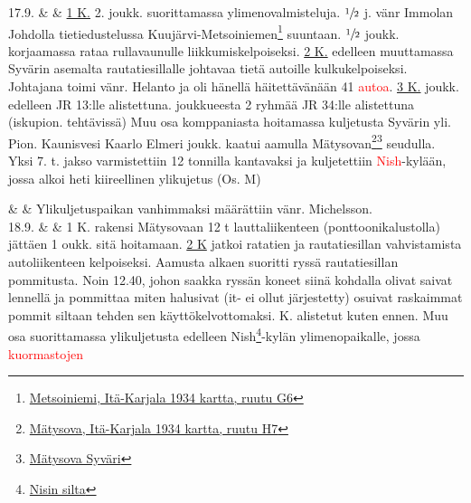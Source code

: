 \documentclass[11pt,a5paper,oneside]{book}
\begin{document}
\newpage

17.9. & & \underline{1 K.} 2. joukk. suorittamassa ylimenovalmisteluja. $\sfrac{1}{2}$ j. vänr Immolan Johdolla tietiedustelussa Kuujärvi-Metsoiniemen\footnote{\href{https://www.google.fi/maps/place/61\%C2\%B008'13.7\%22N+33\%C2\%B050'07.6\%22E/@61.1371306,33.8332443,1153m/}{Metsoiniemi, Itä-Karjala 1934 kartta, ruutu G6}} suuntaan. $\sfrac{1}{2}$ joukk. korjaamassa rataa rullavaunulle liikkumiskelpoiseksi. \newline\newline \underline{2 K.} edelleen muuttamassa Syvärin asemalta rautatiesillalle johtavaa tietä autoille kulkukelpoiseksi. Johtajana toimi vänr. Helanto ja oli hänellä häitettävänään 41 \textcolor{red}{autoa}. \newline\newline \underline{3 K.}  joukk. edelleen JR 13:lle alistettuna.  joukkueesta 2 ryhmää JR 34:lle alistettuna (iskupion. tehtävissä) Muu osa komppaniasta hoitamassa kuljetusta Syvärin yli. Pion. Kaunisvesi Kaarlo Elmeri  joukk. kaatui aamulla Mätysovan\footnote{\href{https://www.google.fi/maps/place/Myatusovo,+Leningrad+Oblast,+Russia,+187790/}{Mätysova, Itä-Karjala 1934 kartta, ruutu H7}}\footnote{\href{https://www.sotahistoriallisetkohteet.fi/app/sights/view/-/id/768/country/9/area/85/}{Mätysova Syväri}} seudulla. Yksi 7. t. jakso varmistettiin 12 tonnilla kantavaksi ja kuljetettiin \textcolor{red}{Nish}-kylään, jossa alkoi heti kiireellinen ylikujetus (Os. M) \\

\taulustop


& & Ylikuljetuspaikan vanhimmaksi määrättiin vänr. Michelsson. \newline\newline\newline \\

18.9. & & 1 K. rakensi Mätysovaan 12 t lauttaliikenteen (ponttoonikalustolla) jättäen 1 oukk. sitä hoitamaan. \newline\newline \underline{2 K} jatkoi ratatien ja rautatiesillan vahvistamista autoliikenteen kelpoiseksi. Aamusta alkaen suoritti ryssä rautatiesillan pommitusta. Noin 12.40, johon saakka ryssän koneet siinä kohdalla olivat saivat lennellä ja pommittaa miten halusivat (it- ei ollut järjestetty) osuivat raskaimmat pommit siltaan tehden sen käyttökelvottomaksi. \newline{} K. alistetut kuten ennen. Muu osa suorittamassa ylikuljetusta edelleen Nish\footnote{\href{https://www.sotahistoriallisetkohteet.fi/app/sights/view/-/id/610/country/9/area/85/}{Nisin silta}}-kylän ylimenopaikalle, jossa \textcolor{red}{kuormastojen} \\
\end{document}
